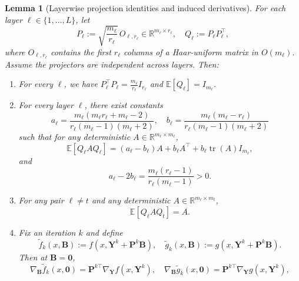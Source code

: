 \documentclass{pkumelon}
\theoremstyle{plain}
\newtheorem{lemma}{Lemma}
\newcommand{\R}{\mathbb{R}}
\newcommand{\E}{\mathbb{E}}
\DeclareMathOperator{\tr}{tr}
\begin{document}
\begin{lemma}[Layerwise projection identities and induced derivatives]\label{lem:projection_moments_matrix}
For each layer $\ell\in\{1,\ldots,L\}$, let
\begin{equation*}
P_\ell:=\sqrt{\frac{m_\ell}{r_\ell}}\,O_{\ell,r_\ell}\in\R^{m_\ell\times r_\ell}, \quad Q_\ell:=P_\ell P_\ell^\top,
\end{equation*}
where $O_{\ell,r_\ell}$ contains the first $r_\ell$ columns of a Haar-uniform matrix in $O(m_\ell)$. Assume the projectors are independent across layers. Then:
\begin{enumerate}
\item[(i)] For every $\ell$, we have $P_\ell^\top P_\ell=\frac{m_\ell}{r_\ell}I_{r_\ell}$ and $\E[Q_\ell]=I_{m_\ell}$.
\item[(ii)] For every layer $\ell$, there exist constants
\begin{equation}\label{eq:ab_proj_matrix}
a_\ell=\frac{m_\ell(m_\ell r_\ell+m_\ell-2)}{r_\ell(m_\ell-1)(m_\ell+2)},
\quad
b_\ell=\frac{m_\ell(m_\ell-r_\ell)}{r_\ell(m_\ell-1)(m_\ell+2)}
\end{equation}
such that for any deterministic $A\in\R^{m_\ell\times m_\ell}$,
\begin{equation}\label{eq:Weingarten_matrix_form}
\E[Q_\ell A Q_\ell]
=(a_\ell-b_\ell)A+b_\ell A^\top+b_\ell\tr(A)I_{m_\ell},
\end{equation}
and
\begin{equation}\label{eq:a_minus_2b}
a_\ell-2b_\ell=\frac{m_\ell(r_\ell-1)}{r_\ell(m_\ell-1)}>0.
\end{equation}
\item[(iii)] For any pair $\ell\neq t$ and any deterministic $A\in\R^{m_\ell\times m_t}$,
\begin{equation}\label{eq:cross_layer_proj_identity}
\E[Q_\ell A Q_t]=A.
\end{equation}
\item[(iv)] Fix an iteration $k$ and define
\begin{equation*}
\tilde f_k(x,\boldsymbol B):=f(x,\boldsymbol Y^k+\boldsymbol P^k\boldsymbol B), \quad \tilde g_k(x,\boldsymbol B):=g(x,\boldsymbol Y^k+\boldsymbol P^k\boldsymbol B).
\end{equation*}
Then at $\boldsymbol B=\mathbf 0$,
\begin{equation*}
\nabla_{\boldsymbol B}\tilde f_k(x,\mathbf 0)=\boldsymbol P^{k\top}\nabla_{\boldsymbol Y}f(x,\boldsymbol Y^k), \quad \nabla_{\boldsymbol B}\tilde g_k(x,\mathbf 0)=\boldsymbol P^{k\top}\nabla_{\boldsymbol Y}g(x,\boldsymbol Y^k),

\end{equation*}
\end{enumerate}
\end{lemma}
\end{document}
